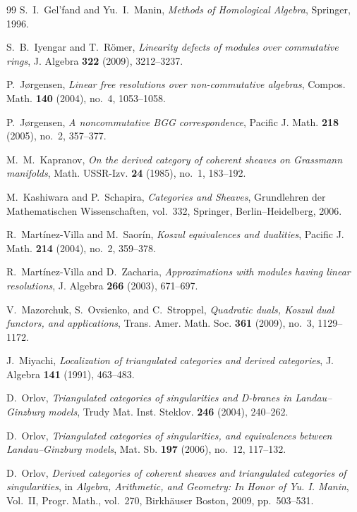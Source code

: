 \documentclass[11pt]{article}
\theoremstyle{definition}
\theoremstyle{remark}
\begin{document}
\begin{thebibliography}{99}
S.~I.~Gel'fand and Yu.~I.~Manin,
\emph{Methods of Homological Algebra},
Springer, 1996.

S.~B.~Iyengar and T.~R\"omer,
\emph{Linearity defects of modules over commutative rings},
J. Algebra \textbf{322} (2009), 3212--3237.

P.~J{\o}rgensen,
\emph{Linear free resolutions over non-commutative algebras},
Compos. Math. \textbf{140} (2004), no.~4, 1053--1058.

P.~J{\o}rgensen,
\emph{A noncommutative BGG correspondence},
Pacific J. Math. \textbf{218} (2005), no.~2, 357--377.

M.~M.~Kapranov,
\emph{On the derived category of coherent sheaves on Grassmann manifolds},
Math. USSR-Izv. \textbf{24} (1985), no.~1, 183--192.

M.~Kashiwara and P.~Schapira,
\emph{Categories and Sheaves},
Grundlehren der Mathematischen Wissenschaften, vol.~332,
Springer, Berlin--Heidelberg, 2006.

R.~Mart\'inez-Villa and M.~Saor\'in,
\emph{Koszul equivalences and dualities},
Pacific J. Math. \textbf{214} (2004), no.~2, 359--378.

R.~Mart\'inez-Villa and D.~Zacharia,
\emph{Approximations with modules having linear resolutions},
J. Algebra \textbf{266} (2003), 671--697.

V.~Mazorchuk, S.~Ovsienko, and C.~Stroppel,
\emph{Quadratic duals, Koszul dual functors, and applications},
Trans. Amer. Math. Soc. \textbf{361} (2009), no.~3, 1129--1172.

J.~Miyachi,
\emph{Localization of triangulated categories and derived categories},
J. Algebra \textbf{141} (1991), 463--483.

D.~Orlov,
\emph{Triangulated categories of singularities and D-branes in Landau--Ginzburg models},
Trudy Mat. Inst. Steklov. \textbf{246} (2004), 240--262.

D.~Orlov,
\emph{Triangulated categories of singularities, and equivalences between Landau--Ginzburg models},
Mat. Sb. \textbf{197} (2006), no.~12, 117--132.

D.~Orlov,
\emph{Derived categories of coherent sheaves and triangulated categories of singularities},
in \emph{Algebra, Arithmetic, and Geometry: In Honor of Yu. I. Manin},
Vol.~II, Progr. Math., vol.~270,
Birkh\"auser Boston, 2009, pp.~503--531.


\end{thebibliography}
\end{document}
